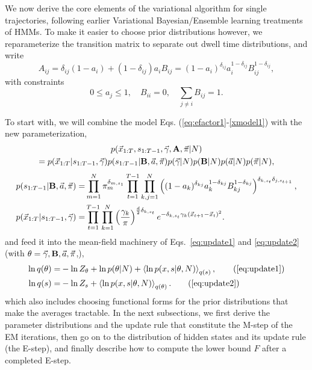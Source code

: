 We now derive the core elements of the variational algorithm for
single trajectories, following earlier Variational Bayesian/Ensemble
learning treatments of HMMs\cite{Bronson2010,Mackay1997,Beal2003}.  To
make it easier to choose prior distributions however, we
reparameterize the transition matrix to separate out dwell time
distributions, and write
\begin{equation}\label{eq:aBdef}
A_{ij}=\delta_{ij}(1-a_i)+(1-\delta_{ij})a_iB_{ij}=
(1-a_i)^{\delta_{ij}}a_i^{1-\delta_{ij}}B_{ij}^{1-\delta_{ij}},
\end{equation}
with constraints
\begin{equation}
0\le a_j\le 1,\quad B_{ii}=0,\quad \sum_{j\ne i}B_{ij}=1.
\end{equation}

To start with, we will combine the model
Eqs. (\ref{eq:efactor1}-\ref{xmodel1}) with the new parameterization,
\begin{multline}
\label{eq:efactor1b}
p(\vec{x}_{1:T},s_{1:T-1},\vec{\gamma},\mathbf{A},\vec\pi|N)\\
=p(\vec{x}_{1:T}|s_{1:T-1},\vec{\gamma})
p(s_{1:T-1}|\mathbf{B},\vec{a},\vec\pi)
p(\vec{\gamma}|N)p(\mathbf{B}|N)p(\vec{a}|N)p(\vec\pi|N),
\end{multline}
\begin{align}
\label{smodel1b}
  p(s_{1:T-1}|\mathbf{B},\vec a,\vec{\pi})=&
  \prod_{m=1}^N\pi_m^{\delta_{m,s_1}}
  \prod_{t=1}^{T-1}\prod_{k,j=1}^N 
  \left((1-a_k)^{\delta_{kj}}a_k^{1-\delta_{kj}}
  B_{kj}^{1-\delta_{kj}}\right)^{\delta_{k,s_t}\delta_{j,s_{t+1}}},\\
    \label{xmodel1b}
    p(\vec{x}_{1:T}|s_{1:T-1},\vec\gamma)=&
    \prod_{t=1}^{T-1}\prod_{k=1}^N\left(
    \frac{\gamma_k}{\pi}\right)^{\frac d2\delta_{k,s_t}}
    e^{-\delta_{k,s_t}\gamma_k(\vec{x}_{t+1}-\vec{x}_t)^2}. 
\end{align}
and feed it into the mean-field machinery of Eqs.~\eqref{eq:update1}
and \eqref{eq:update2} (with
$\theta=\vec{\gamma},\mathbf{B},\vec{a},\vec{\pi}$,),
\begin{align}
  \ln q(\theta)=&-\ln Z_\theta+\ln p(\theta|N)
  +\mean{\ln p(x,s|\theta,N)}_{q(s)},\tag{\ref{eq:update1}}\\
  \ln q(s)=&-\ln Z_s+\mean{\ln p(x,s|\theta,N)}_{q(\theta)}.
\tag{\ref{eq:update2}}
\end{align}
which also includes choosing functional forms for the prior
distributions that make the averages tractable. In the next
subsections, we first derive the parameter distributions and the
update rule that constitute the M-step of the EM iterations, then go on
to the distribution of hidden states and its update rule (the E-step),
and finally describe how to compute the lower bound $F$ after a
completed E-step.

